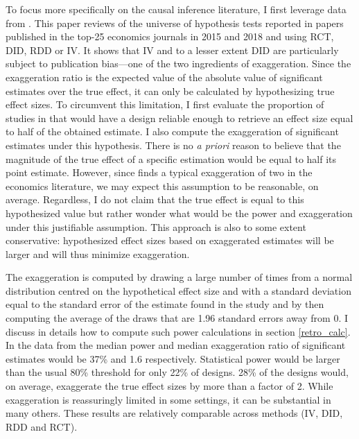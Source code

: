 \documentclass[usletter, 12pt]{article}
\begin{document}
			To focus more specifically on the causal inference literature, I first leverage data from \cite{brodeur_methods_2020}. This paper reviews of the universe of hypothesis tests reported in papers published in the top-25 economics journals in 2015 and 2018 and using RCT, DID, RDD or IV. It shows that IV and to a lesser extent DID are particularly subject to publication bias---one of the two ingredients of exaggeration. 
			Since the exaggeration ratio is the expected value of the absolute value of significant estimates over the true effect, it can only be calculated by hypothesizing true effect sizes. 
			To circumvent this limitation, I first evaluate the proportion of studies in \cite{brodeur_methods_2020} that would have a design reliable enough to retrieve an effect size equal to half of the obtained estimate. I also compute the exaggeration of significant estimates under this hypothesis. There is no \textit{a priori} reason to believe that the magnitude of the true effect of a specific estimation would be equal to half its point estimate. However, since \cite{ioannidis_power_2017} finds a typical exaggeration of two in the economics literature, we may expect this assumption to be reasonable, on average. Regardless, I do not claim that the true effect is equal to this hypothesized value but rather wonder what would be the power and exaggeration under this justifiable assumption. This approach is also to some extent conservative: hypothesized effect sizes based on exaggerated estimates will be larger and will thus minimize exaggeration.
			
			 The exaggeration is computed by drawing a large number of times from a normal distribution centred on the hypothetical effect size and with a standard deviation equal to the standard error of the estimate found in the study and by then computing the average of the draws that are 1.96 standard errors away from 0. I discuss in details how to compute such power calculations in section \ref{retro_calc}. In the data from \cite{brodeur_methods_2020} the median power and median exaggeration ratio of significant estimates would be 37\% and 1.6 respectively. Statistical power would be larger than the usual 80\% threshold for only 22\% of designs. 28\% of the designs would, on average, exaggerate the true effect sizes by more than a factor of 2. While exaggeration is reassuringly limited in some settings, it can be substantial in many others. These results are relatively comparable across methods (IV, DID, RDD and RCT). 
			
\end{document}

